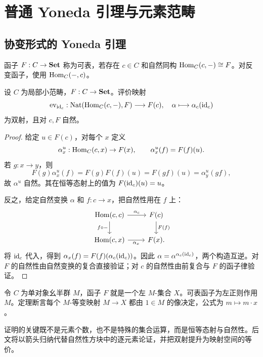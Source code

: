 \chapter{普通 Yoneda 引理与元素范畴}
\section{协变形式的 Yoneda 引理}
\begin{definition}[可表函子]
函子 $F:C\to\mathbf{Set}$ 称为可表，若存在 $c\in C$ 和自然同构 $\operatorname{Hom}_C(c,-)\cong F$。对反变函子，使用 $\operatorname{Hom}_C(-,c)$。
\end{definition}
\begin{theorem}[协变 Yoneda 引理]\label{thm:ordinary-yoneda}
设 $C$ 为局部小范畴，$F:C\to\mathbf{Set}$。评价映射
\[
\operatorname{ev}_{\operatorname{id}_c}:\operatorname{Nat}(\operatorname{Hom}_C(c,-),F)\longrightarrow F(c),
\quad\alpha\longmapsto\alpha_c(\operatorname{id}_c)
\]
为双射，且对 $c,F$ 自然。
\end{theorem}
\begin{proof}
给定 $u\in F(c)$，对每个 $x$ 定义
\[
\alpha^u_x:\operatorname{Hom}_C(c,x)\to F(x),
\qquad \alpha^u_x(f)=F(f)(u).
\]
若 $g:x\to y$，则
\[
F(g)\alpha^u_x(f)=F(g)F(f)(u)=F(gf)(u)=\alpha^u_y(gf),
\]
故 $\alpha^u$ 自然。其在恒等态射上的值为 $F(\operatorname{id}_c)(u)=u$。

反之，给定自然变换 $\alpha$ 和 $f:c\to x$，把自然性用在 $f$ 上：
\[
\begin{tikzcd}
\Hom(c,c)\ar[r,"\alpha_c"]\ar[d,"f\circ-"']&F(c)\ar[d,"F(f)"]\\
\Hom(c,x)\ar[r,"\alpha_x"']&F(x).
\end{tikzcd}
\]
将 $\operatorname{id}_c$ 代入，得到 $\alpha_x(f)=F(f)(\alpha_c(\operatorname{id}_c))$。因此 $\alpha=\alpha^{\alpha_c(\operatorname{id}_c)}$，两个构造互逆。对 $F$ 的自然性由自然变换的复合直接验证；对 $c$ 的自然性由前复合与 $F$ 的函子律验证。
\end{proof}
\begin{example}
令 $C$ 为单对象幺半群 $M$，函子 $F$ 就是一个左 $M$-集合 $X$。可表函子为左正则作用 $M$。定理断言每个 $M$-等变映射 $M\to X$ 都由 $1\in M$ 的像决定，公式为 $m\mapsto m\cdot x$。
\end{example}
\begin{remark}
证明的关键既不是元素个数，也不是特殊的集合运算，而是恒等态射与自然性。后文将以箭头归纳代替自然性方块中的逐元素论证，并把双射提升为映射空间的等价。
\end{remark}

